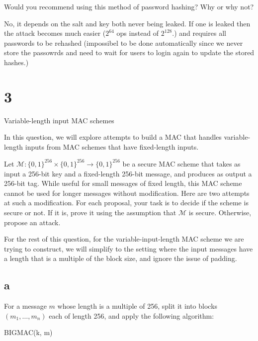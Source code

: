 \documentclass[11pt]{article}
\begin{document}
Would you recommend using this method of password hashing? Why or why not?

No, it depends on the salt and key both never being leaked. If one is leaked then the attack becomes much easier ($2^{64}$ ops instead of $2^{128}$.) and requires all passwords to be rehashed (impossibel to be done automatically since we never store the passowrds and need to wait for users to login again to update the stored hashes.) 

\newpage

\section{3}

Variable-length input MAC schemes

In this question, we will explore attempts to build a MAC that handles variable-length inputs from MAC schemes that have fixed-length inputs.

Let $\mathcal{M}: \{0, 1\}^{256} \times \{0, 1\}^{256} \to \{0, 1\}^{256}$ be a secure MAC scheme that takes as input a 256-bit key and a fixed-length 256-bit message, and produces as output a 256-bit tag. While useful for small messages of fixed length, this MAC scheme cannot be used for longer messages without modification. Here are two attempts at such a modification. For each proposal, your task is to decide if the scheme is secure or not. If it is, prove it using the assumption that $\mathcal{M}$ is secure. Otherwise, propose an attack.

For the rest of this question, for the variable-input-length MAC scheme we are trying to construct, we will simplify to the setting where the input messages have a length that is a multiple of the block size, and ignore the issue of padding.

\subsection{a}

For a message $m$ whose length is a multiple of 256, split it into blocks $(m_1, \ldots, m_n)$ each of length 256, and apply the following algorithm:

\begin{algorithm}
    \caption{BIGMAC(k, m)}
\end{algorithm}
\end{document}
